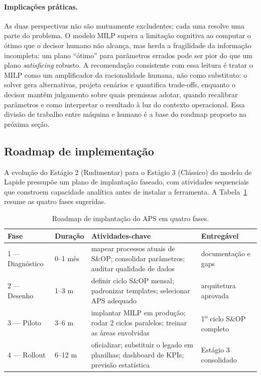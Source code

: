 \documentclass[11pt,a4paper]{article}
\begin{document}
\paragraph{Implicações práticas.} As duas perspectivas não são mutuamente excludentes; cada uma resolve uma parte do problema. O modelo MILP supera a limitação cognitiva ao computar o ótimo que o decisor humano não alcança, mas herda a fragilidade da informação incompleta: um plano ``ótimo'' para parâmetros errados pode ser pior do que um plano \emph{satisficing} robusto. A recomendação consistente com essa leitura é tratar o MILP como um amplificador da racionalidade humana, não como substituto: o solver gera alternativas, projeta cenários e quantifica trade-offs, enquanto o decisor mantém julgamento sobre quais premissas adotar, quando recalibrar parâmetros e como interpretar o resultado à luz do contexto operacional. Essa divisão de trabalho entre máquina e humano é a base do roadmap proposto na próxima seção.

\subsection{Roadmap de implementação}
A evolução do Estágio 2 (Rudimentar) para o Estágio 3 (Clássico) do modelo de Lapide pressupõe um plano de implantação faseado, com atividades sequenciais que constroem capacidade analítica antes de instalar a ferramenta. A Tabela~\ref{tab:roadmap} resume as quatro fases sugeridas.

\begin{table}[h]
\centering
\caption{Roadmap de implantação do APS em quatro fases.}
\label{tab:roadmap}
\small
\begin{tabular}{p{2.3cm}p{1.6cm}p{6.4cm}p{3.8cm}}
\toprule
\textbf{Fase} & \textbf{Duração} & \textbf{Atividades-chave} & \textbf{Entregável} \\
\midrule
1 — Diagnóstico & 0–1 mês & mapear processos atuais de S\&OP; consolidar parâmetros; auditar qualidade de dados & documentação e gaps \\
2 — Desenho     & 1–3 m   & definir ciclo S\&OP mensal; padronizar templates; selecionar APS adequado & arquitetura aprovada \\
3 — Piloto      & 3–6 m   & implantar MILP em produção; rodar 2 ciclos paralelos; treinar as áreas envolvidas & 1\textsuperscript{o} ciclo S\&OP completo \\
4 — Rollout     & 6–12 m  & oficializar; substituir o legado em planilhas; dashboard de KPIs; previsão estatística & Estágio 3 consolidado \\
\bottomrule
\end{tabular}
\end{table}
\end{document}
